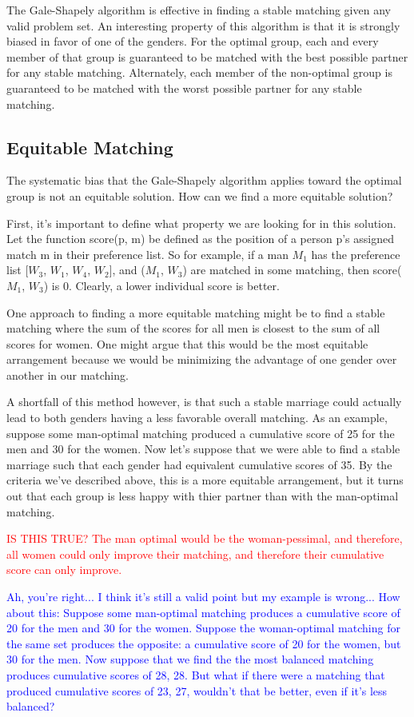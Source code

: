 \documentclass[a4paper]{article}
\begin{document}
The Gale-Shapely algorithm is effective in finding a stable matching given any valid problem set. An interesting property of this algorithm is that it is strongly biased in favor of one of the genders. For the optimal group, each and every member of that group is guaranteed to be matched with the best possible partner for any stable matching. Alternately, each member of the non-optimal group is guaranteed to be matched with the worst possible partner for any stable matching.

\subsection{Equitable Matching}
The systematic bias that the Gale-Shapely algorithm applies toward the optimal group is not an equitable solution. How can we find a more equitable solution?

First, it's important to define what property we are looking for in this solution. Let the function score(p, m) be defined as the position of a person p's assigned match m in their preference list. So for example, if a man $M_1$ has the preference list [$W_3$, $W_1$, $W_4$, $W_2$], and ($M_1$, $W_3$) are matched in some matching, then score($M_1$, $W_3$) is $0$. Clearly, a lower individual score is better.

One approach to finding a more equitable matching might be to find a stable matching where the sum of the scores for all men is closest to the sum of all scores for women. One might argue that this would be the most equitable arrangement because we would be minimizing the advantage of one gender over another in our matching.

A shortfall of this method however, is that such a stable marriage could actually lead to both genders having a less favorable overall matching. As an example, suppose some man-optimal matching produced a cumulative score of 25 for the men and 30 for the women. Now let's suppose that we were able to find a stable marriage such that each gender had equivalent cumulative scores of 35. By the criteria we've described above, this is a more equitable arrangement, but it turns out that each group is less happy with thier partner than with the man-optimal matching.

\textcolor{red}{IS THIS TRUE? The man optimal would be the woman-pessimal, and therefore, all women could only improve their matching, and therefore their cumulative score can only improve.}

\textcolor{blue}{Ah, you're right... I think it's still a valid point but my example is wrong... How about this: Suppose some man-optimal matching produces a cumulative score of 20 for the men and 30 for the women. Suppose the woman-optimal matching for the same set produces the opposite: a cumulative score of 20 for the women, but 30 for the men. Now suppose that we find the the most balanced matching produces cumulative scores of 28, 28. But what if there were a matching that produced cumulative scores of 23, 27, wouldn't that be better, even if it's less balanced? }
\end{document}
